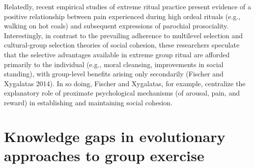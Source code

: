 Relatedly, recent empirical studies of extreme ritual practice present evidence of a positive relationship between pain experienced during high ordeal rituals (e.g., walking on hot coals) and subsequent expressions of parochial prosociality. Interestingly, in contrast to the prevailing adherence to multilevel selection and cultural-group selection theories of social cohesion, these researchers speculate that the selective advantages available in extreme group ritual are afforded primarily to the individual (e.g., moral cleansing, improvements in social standing), with group-level benefits arising only secondarily (Fischer and Xygalatas 2014). In so doing, Fischer and Xygalatas, for example, centralize the explanatory role of proximate psychological mechanisms (of arousal, pain, and reward) in establishing and maintaining social cohesion.




\section{Knowledge gaps in evolutionary approaches to group exercise}

